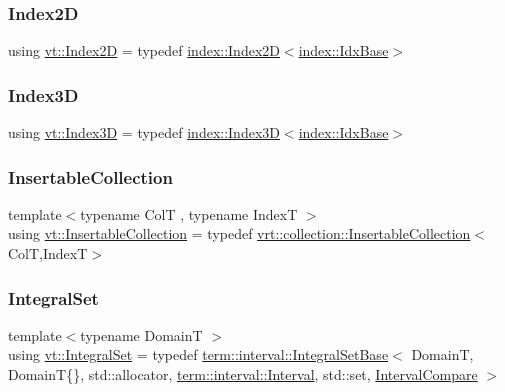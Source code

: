 \mbox{\label{namespacevt_a3bab786053b74a3d856fff1412ffa73a}} 
\subsubsection{\texorpdfstring{Index2D}{Index2D}}
{\footnotesize\ttfamily using \hyperlink{namespacevt_a3bab786053b74a3d856fff1412ffa73a}{vt\+::\+Index2D} = typedef \hyperlink{namespacevt_1_1index_a8373801efc8343f24d6e8ba57df40a69}{index\+::\+Index2D}$<$\hyperlink{namespacevt_1_1index_a0dbb8d47463da27c1436e8e4ddb02743}{index\+::\+Idx\+Base}$>$}

\mbox{\label{namespacevt_a2c8053bc5f2df4934272542fb3e5a0bc}} 
\subsubsection{\texorpdfstring{Index3D}{Index3D}}
{\footnotesize\ttfamily using \hyperlink{namespacevt_a2c8053bc5f2df4934272542fb3e5a0bc}{vt\+::\+Index3D} = typedef \hyperlink{namespacevt_1_1index_a2c09a09f7346d370a0bcbbfb0d4459cd}{index\+::\+Index3D}$<$\hyperlink{namespacevt_1_1index_a0dbb8d47463da27c1436e8e4ddb02743}{index\+::\+Idx\+Base}$>$}

\mbox{\label{namespacevt_a7ffafd5682603cf80b1874f83cc7234f}} 
\subsubsection{\texorpdfstring{Insertable\+Collection}{InsertableCollection}}
{\footnotesize\ttfamily template$<$typename ColT , typename IndexT $>$ \\
using \hyperlink{namespacevt_a7ffafd5682603cf80b1874f83cc7234f}{vt\+::\+Insertable\+Collection} = typedef \hyperlink{structvt_1_1vrt_1_1collection_1_1_insertable_collection}{vrt\+::collection\+::\+Insertable\+Collection}$<$ColT,IndexT$>$}

\mbox{\label{namespacevt_af8fc7210a3d8e598330cf3375857ef1e}} 
\subsubsection{\texorpdfstring{Integral\+Set}{IntegralSet}}
{\footnotesize\ttfamily template$<$typename DomainT $>$ \\
using \hyperlink{namespacevt_af8fc7210a3d8e598330cf3375857ef1e}{vt\+::\+Integral\+Set} = typedef \hyperlink{structvt_1_1term_1_1interval_1_1_integral_set_base}{term\+::interval\+::\+Integral\+Set\+Base}$<$ DomainT, DomainT\{\}, std\+::allocator, \hyperlink{structvt_1_1term_1_1interval_1_1_interval}{term\+::interval\+::\+Interval}, std\+::set, \hyperlink{namespacevt_ab51b754f1d22841f555246195fab9d41}{Interval\+Compare} $>$}

